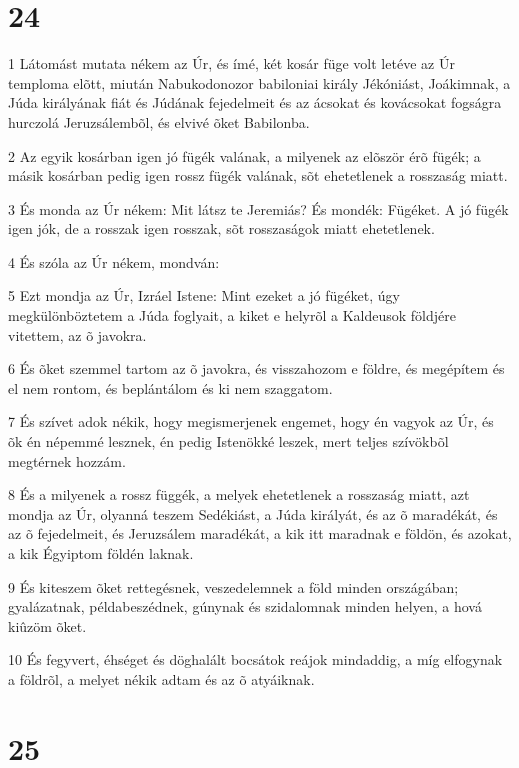 \chapter{24}

\par 1 Látomást mutata nékem az Úr, és ímé, két kosár füge volt letéve az Úr temploma elõtt, miután Nabukodonozor babiloniai király Jékóniást, Joákimnak, a Júda királyának fiát és Júdának fejedelmeit és az ácsokat és kovácsokat fogságra hurczolá Jeruzsálembõl, és elvivé õket Babilonba.
\par 2 Az egyik kosárban igen jó fügék valának, a milyenek az elõször érõ fügék; a másik kosárban pedig igen rossz fügék valának, sõt ehetetlenek a rosszaság miatt.
\par 3 És monda az Úr nékem: Mit látsz te Jeremiás? És mondék: Fügéket. A jó fügék igen jók, de a rosszak igen rosszak, sõt rosszaságok miatt ehetetlenek.
\par 4 És szóla az Úr nékem, mondván:
\par 5 Ezt mondja az Úr, Izráel Istene: Mint ezeket a jó fügéket, úgy megkülönböztetem a Júda foglyait, a kiket e helyrõl a Kaldeusok földjére vitettem, az õ javokra.
\par 6 És õket szemmel tartom az õ javokra, és visszahozom e földre, és megépítem és el nem rontom, és beplántálom és ki nem szaggatom.
\par 7 És szívet adok nékik, hogy megismerjenek engemet, hogy én vagyok az Úr, és õk  én népemmé lesznek, én pedig Istenökké leszek, mert teljes szívökbõl megtérnek hozzám.
\par 8 És a milyenek a rossz függék, a melyek ehetetlenek a rosszaság miatt, azt mondja az Úr, olyanná teszem Sedékiást, a Júda királyát, és az õ maradékát, és az õ fejedelmeit, és Jeruzsálem maradékát, a kik itt maradnak e földön, és azokat, a kik Égyiptom földén laknak.
\par 9 És kiteszem õket rettegésnek, veszedelemnek a föld minden országában; gyalázatnak, példabeszédnek, gúnynak és szidalomnak minden helyen, a hová kiûzöm õket.
\par 10 És fegyvert, éhséget és döghalált bocsátok reájok mindaddig, a míg elfogynak a földrõl, a melyet nékik adtam és az õ atyáiknak.

\chapter{25}

